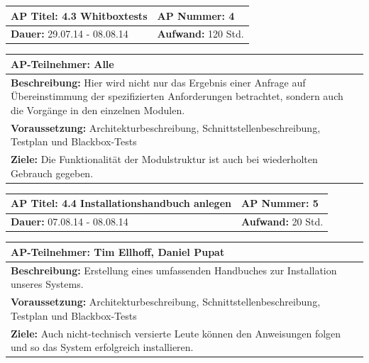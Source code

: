 \documentclass[fontsize=12pt,paper=a4,twoside]{scrartcl}
\begin{document}
\begin{tabular}{|p{7.43cm}|p{7.43cm}|}
\hline
\textbf{AP Titel: }4.3 Whitboxtests & \textbf{AP Nummer: }4\\ 
\hline
\textbf{Dauer: }29.07.14 - 08.08.14& \textbf{Aufwand: } 120 Std.\\
\hline
\end{tabular}
\begin{tabular}{|p{15.3cm}|}
\hline
\textbf{AP-Teilnehmer: }Alle\\
\hline
\textbf{Beschreibung: }Hier wird nicht nur das Ergebnis einer Anfrage auf Übereinstimmung der spezifizierten Anforderungen betrachtet, sondern auch die Vorgänge 
in den einzelnen Modulen.\\
\hline
\textbf{Voraussetzung: }Architekturbeschreibung, Schnittstellenbeschreibung, Testplan und Blackbox-Tests \\
\hline 
\textbf{Ziele: }Die Funktionalität der Modulstruktur ist auch bei wiederholten Gebrauch gegeben.\\
\hline 
\end{tabular}

\begin{tabular}{|p{7.43cm}|p{7.43cm}|}
\hline
\textbf{AP Titel: }4.4 Installationshandbuch anlegen & \textbf{AP Nummer: }5\\ 
\hline
\textbf{Dauer: }07.08.14 - 08.08.14& \textbf{Aufwand: } 20 Std.\\
\hline
\end{tabular}
\begin{tabular}{|p{15.3cm}|}
\hline
\textbf{AP-Teilnehmer: }Tim Ellhoff, Daniel Pupat\\
\hline
\textbf{Beschreibung: }Erstellung eines umfassenden Handbuches zur Installation unseres Systems.\\
\hline
\textbf{Voraussetzung: }Architekturbeschreibung, Schnittstellenbeschreibung, Testplan und Blackbox-Tests \\
\hline 
\textbf{Ziele: }Auch nicht-technisch versierte Leute können den Anweisungen folgen und so das System erfolgreich installieren.\\
\hline 
\end{tabular}
\end{document}
